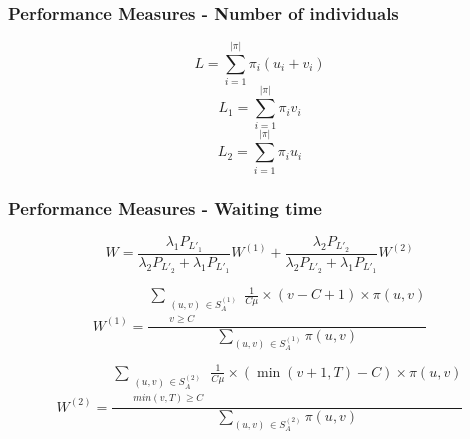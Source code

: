 \begin{frame}
    \frametitle{Performance Measures - Number of individuals}
    \centering

    \pause

    \begin{equation*}
        L = \sum_{i=1}^{|\pi|} \pi_{i} (u_i + v_i) 
    \end{equation*}
    \begin{equation*}
        L_1 = \sum_{i=1}^{|\pi|} \pi_{i} v_i 
    \end{equation*}
    \begin{equation*}
        L_2 = \sum_{i=1}^{|\pi|} \pi_{i} u_i 
    \end{equation*}

\end{frame}


\begin{frame}
    \frametitle{Performance Measures - Waiting time}
    \centering

    \begin{equation*}
        W = \frac{\lambda_1 P_{L'_1}}{\lambda_2 P_{L'_2} + \lambda_1 P_{L'_1}} W^{(1)} 
        + \frac{\lambda_2 P_{L'_2}}{\lambda_2 P_{L'_2} + \lambda_1 P_{L'_1}} W^{(2)}
    \end{equation*}

    \begin{equation*}
        W^{(1)} = \frac{\sum_{\substack{(u,v) \, \in S_A^{(1)} \\ v \geq C}} 
        \frac{1}{C \mu} \times (v-C+1) \times \pi(u,v)}{\sum_{(u,v) \, 
        \in S_A^{(1)}} \pi(u,v)}
    \end{equation*}
        
    \begin{equation*}
        W^{(2)} = \frac{\sum_{\substack{(u,v) \, \in S_A^{(2)} \\ min(v,T) \geq C}} 
        \frac{1}{C \mu} \times (\min(v+1,T)-C) \times \pi(u,v)}{\sum_{(u,v) \, 
        \in S_A^{(2)}} \pi(u,v)}
    \end{equation*} 

\end{frame}


